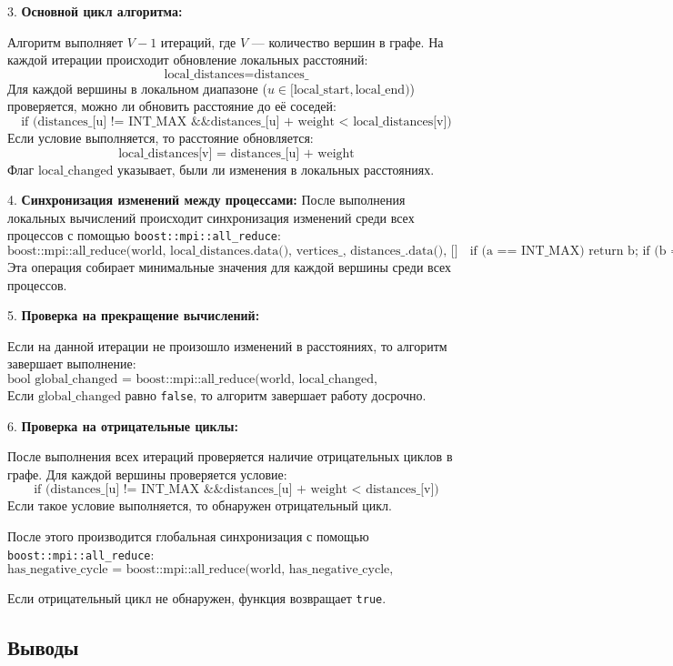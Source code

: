 \documentclass[12pt]{article}
\begin{document}
3. \textbf{Основной цикл алгоритма:}

   Алгоритм выполняет \(V-1\) итераций, где \(V\) — количество вершин в графе. На каждой итерации происходит обновление локальных расстояний:
   \[
   \text{local\_distances} = \text{distances\_}
   \]
   Для каждой вершины в локальном диапазоне (\(u \in [\text{local\_start}, \text{local\_end})\)) проверяется, можно ли обновить расстояние до её соседей:
   \[
   \text{if (distances\_[u] != INT\_MAX \&\& distances\_[u] + weight < local\_distances[v])}
   \]
   Если условие выполняется, то расстояние обновляется:
   \[
   \text{local\_distances[v] = distances\_[u] + weight}
   \]
   Флаг \(\text{local\_changed}\) указывает, были ли изменения в локальных расстояниях.

4. \textbf{Синхронизация изменений между процессами:}
   После выполнения локальных вычислений происходит синхронизация изменений среди всех процессов с помощью \texttt{boost::mpi::all\_reduce}:
   \[
   \text{boost::mpi::all\_reduce(world, local\_distances.data(), vertices\_, distances\_.data(), [](int a, int b) { if (a == INT\_MAX) return b; if (b == INT\_MAX) return a; return std::min(a, b); })}
   \]
   Эта операция собирает минимальные значения для каждой вершины среди всех процессов.
   
5. \textbf{Проверка на прекращение вычислений:}

   Если на данной итерации не произошло изменений в расстояниях, то алгоритм завершает выполнение:
   \[
   \text{bool global\_changed = boost::mpi::all\_reduce(world, local\_changed, std::logical\_or<>())}
   \]
   Если \(\text{global\_changed}\) равно \texttt{false}, то алгоритм завершает работу досрочно.

6. \textbf{Проверка на отрицательные циклы:}

   После выполнения всех итераций проверяется наличие отрицательных циклов в графе. Для каждой вершины проверяется условие:
   \[
   \text{if (distances\_[u] != INT\_MAX \&\& distances\_[u] + weight < distances\_[v])}
   \]
   Если такое условие выполняется, то обнаружен отрицательный цикл.

   После этого производится глобальная синхронизация с помощью \texttt{boost::mpi::all\_reduce}:
   \[
   \text{has\_negative\_cycle = boost::mpi::all\_reduce(world, has\_negative\_cycle, std::logical\_or<>())}
   \]

   Если отрицательный цикл не обнаружен, функция возвращает \texttt{true}.
\subsection{Выводы}
\end{document}
